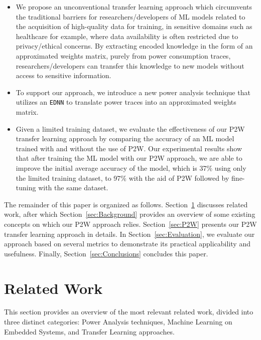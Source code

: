 \documentclass[letterpaper]{article}
\begin{document}
\begin{itemize}
\item We propose an unconventional transfer learning approach which circumvents the traditional barriers for researchers/developers of ML models related to the acquisition of high-quality data for training, in sensitive domains such as healthcare for example, where data availability is often restricted due to privacy/ethical concerns. By extracting encoded knowledge in the form of an approximated weights matrix, purely from power consumption traces, researchers/developers can transfer this knowledge to new models without access to sensitive information.

\item To support our approach, we introduce a new power analysis technique that utilizes an \texttt{EDNN} to translate power traces into an approximated weights matrix.
    

\item Given a limited training dataset, we evaluate the effectiveness of our P2W transfer learning approach by comparing the accuracy of an ML model trained with and without the use of P2W. Our experimental results show that after training the ML model with our P2W approach, we are able to improve the initial average accuracy of the model, which is 37\% using only the limited training dataset, to 97\% with the aid of P2W followed by fine-tuning with the same dataset.
\end{itemize}

The remainder of this paper is organized as follows.
Section~\ref{sec:RelatedWork} discusses related work, after which Section~\ref{sec:Background} provides an overview of some existing concepts on which our P2W approach relies. Section~\ref{sec:P2W} 
presents our P2W transfer learning approach in details. In Section~\ref{sec:Evaluation}, we evaluate our approach based on several metrics to demonstrate its practical applicability and usefulness. Finally, Section~\ref{sec:Conclusions} concludes this paper.

    


\section{Related Work}
\label{sec:RelatedWork}
This section provides an overview of the most relevant related work, divided into three distinct categories: Power Analysis techniques, Machine Learning on Embedded Systems, and Transfer Learning approaches.
\end{document}
